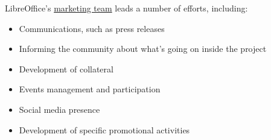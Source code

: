 \begin{kaobox}[frametitle=Marketing efforts of LibreOffice]

LibreOffice's \href{https://www.libreoffice.org/community/marketing/}{marketing team} leads a number of efforts, including:

\begin{itemize}

\item Communications, such as press releases

\item Informing the community about what's going on inside the project

\item Development of collateral

\item Events management and participation

\item Social media presence

\item Development of specific promotional activities

\end{itemize}

\end{kaobox}

